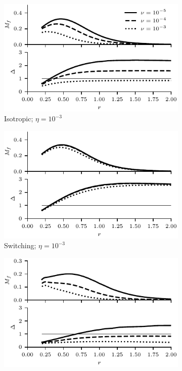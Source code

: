 \begin{figure}[t]
    \hfill
    \begin{subfigure}{0.49\textwidth}
      \centering
  \includegraphics[width=1.0\linewidth]{param_study/mach_numbers_eta_3_iso.pdf}
      \caption{Isotropic; $\eta = 10^{-3}$}%
      \label{fig:mach_numbers_eta_3_iso}
    \end{subfigure}
    \hfill
    \begin{subfigure}{0.49\textwidth}
      \centering
  \includegraphics[width=1.0\linewidth]{param_study/mach_numbers_eta_3_swi.pdf}
      \caption{Switching; $\eta = 10^{-3}$}%
      \label{fig:mach_numbers_eta_3_swi}
    \end{subfigure}
    \hfill
    \begin{subfigure}{0.49\textwidth}
      \centering
  \includegraphics[width=1.0\linewidth]{param_study/mach_numbers_eta_4_iso.pdf}

\end{subfigure}
\end{figure}
